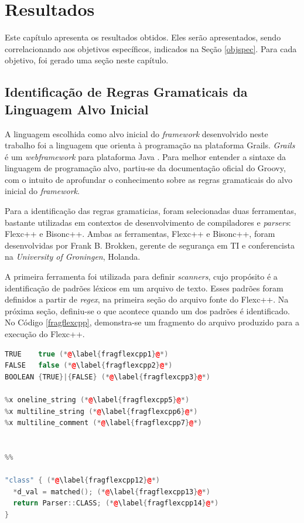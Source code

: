 \chapter[Resultados]{Resultados}
Este capítulo apresenta os resultados obtidos. Eles serão apresentados, sendo
correlacionando aos objetivos específicos, indicados na Seção \ref{objspec}.
Para cada objetivo, foi gerado uma seção neste capítulo.

\section{Identificação de Regras Gramaticais da Linguagem Alvo Inicial}
A linguagem escolhida como alvo inicial do \textit{framework} desenvolvido
neste trabalho foi a linguagem que orienta à programação na plataforma \textsf{Grails}. \textit{Grails} é um \textit{webframework} para plataforma Java
\cite{grails2015}. Para melhor entender a sintaxe da linguagem de programação
alvo, partiu-se da documentação oficial do \textsf{Groovy}, com o intuito de
aprofundar o conhecimento sobre as regras gramaticais do alvo inicial do
\textit{framework}.

Para a identificação das regras gramaticias, foram selecionadas duas ferramentas,
bastante utilizadas em contextos de desenvolvimento de compiladores e
\textit{parsers}: \textsf{Flexc++} e \textsf{Bisonc++}. Ambas as ferramentas, \textsf{Flexc++} e \textsf{Bisonc++}, foram desenvolvidas por Frank B. Brokken, gerente de segurança em TI e conferencista na \textit{University of Groningen}, Holanda.

A primeira ferramenta foi utilizada para definir \textit{scanners}, cujo propósito é a identificação de padrões léxicos em um arquivo de texto. Esses padrões foram definidos a partir de \textit{regex}, na primeira seção do arquivo fonte do Flexc++. Na próxima seção, definiu-se o que acontece quando um dos padrões é identificado. No Código \ref{fragflexcpp}, demonstra-se um fragmento do arquivo produzido para a execução do \textsf{Flexc++}.

\begin{lstlisting}[language=C++, label=fragflexcpp, caption=Fragmento do código fonte para o \flexcpp]
TRUE    true (*@\label{fragflexcpp1}@*)
FALSE   false (*@\label{fragflexcpp2}@*)
BOOLEAN {TRUE}|{FALSE} (*@\label{fragflexcpp3}@*)

%x oneline_string (*@\label{fragflexcpp5}@*)
%x multiline_string (*@\label{fragflexcpp6}@*)
%x multiline_comment (*@\label{fragflexcpp7}@*)


%%

"class" { (*@\label{fragflexcpp12}@*)
  *d_val = matched(); (*@\label{fragflexcpp13}@*)
  return Parser::CLASS; (*@\label{fragflexcpp14}@*)
}
\end{lstlisting}

